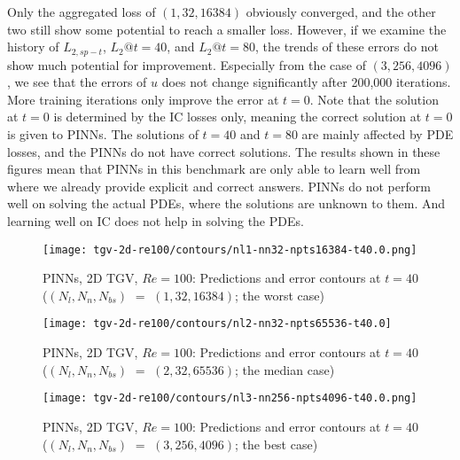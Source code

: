 Only the aggregated loss of $(1, 32, 16384)$ obviously converged, and the other two still show some potential to reach a smaller loss.
However, if we examine the history of $L_{2,sp-t}$, $L_2@t=40$, and $L_2@t=80$, the trends of these errors do not show much potential for improvement.
Especially from the case of $(3, 256, 4096)$, we see that the errors of $u$ does not change significantly after 200,000 iterations.
More training iterations only improve the error at $t=0$.
Note that the solution at $t=0$ is determined by the IC losses only, meaning the correct solution at $t=0$ is given to PINNs.
The solutions of $t=40$ and $t=80$ are mainly affected by PDE losses, and the PINNs do not have correct solutions.
The results shown in these figures mean that PINNs in this benchmark are only able to learn well from where we already provide explicit and correct answers.
PINNs do not perform well on solving the actual PDEs, where the solutions are unknown to them.
And learning well on IC does not help in solving the PDEs.

\begin{figure}[hbt!]
    \centering%
    \texttt{[image: tgv-2d-re100/contours/nl1-nn32-npts16384-t40.0.png]}
    \caption[%
        PINNs, 2D TGV, $Re=100$: Predictions and error contours at $t=40$ ($(N_l, N_n, N_{bs})=(1, 32, 16384)$; the worst case)%
    ]{%
        PINNs, 2D TGV, $Re=100$: Predictions and error contours at $t=40$ ($(N_l, N_n, N_{bs})$ $=$ $(1, 32, 16384)$; the worst case)%
    }
    \label{fig:nl1-nn32-npts16384-t40-contours}
\end{figure}

\begin{figure}[hbt!]
    \centering%
    \texttt{[image: tgv-2d-re100/contours/nl2-nn32-npts65536-t40.0]}
    \caption[%
        PINNs, 2D TGV, $Re=100$: Predictions and error contours at $t=40$ ($(N_l, N_n, N_{bs})=(2, 32, 65536)$; the median case)%
    ]{%
        PINNs, 2D TGV, $Re=100$: Predictions and error contours at $t=40$ ($(N_l, N_n, N_{bs})$ $=$ $(2, 32, 65536)$; the median case)%
    }
    \label{fig:nl2-nn32-npts65536-t40-contours}
\end{figure}

\begin{figure}[hbt!]
    \centering%
    \texttt{[image: tgv-2d-re100/contours/nl3-nn256-npts4096-t40.0.png]}
    \caption[%
        PINNs, 2D TGV, $Re=100$: Predictions and error contours at $t=40$ ($(N_l, N_n, N_{bs})=(3, 256, 4096)$; the best case)%
    ]{%
        PINNs, 2D TGV, $Re=100$: Predictions and error contours at $t=40$ ($(N_l, N_n, N_{bs})$ $=$ $(3, 256, 4096)$; the best case)%
    }
    \label{fig:nl3-nn256-npts4096-t40-contours}
\end{figure}

